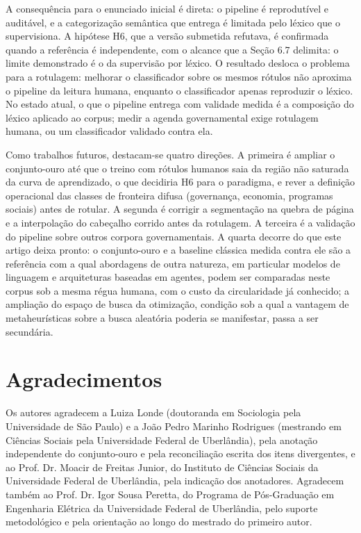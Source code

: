 \documentclass[fleqn,10pt]{SelfArx}
\begin{document}
A consequência para o enunciado inicial é direta: o pipeline é reprodutível e auditável, e a categorização semântica que entrega é limitada pelo léxico que o supervisiona. A hipótese H6, que a versão submetida refutava, é confirmada quando a referência é independente, com o alcance que a Seção 6.7 delimita: o limite demonstrado é o da supervisão por léxico. O resultado desloca o problema para a rotulagem: melhorar o classificador sobre os mesmos rótulos não aproxima o pipeline da leitura humana, enquanto o classificador apenas reproduzir o léxico. No estado atual, o que o pipeline entrega com validade medida é a composição do léxico aplicado ao corpus; medir a agenda governamental exige rotulagem humana, ou um classificador validado contra ela.

Como trabalhos futuros, destacam-se quatro direções. A primeira é ampliar o conjunto-ouro até que o treino com rótulos humanos saia da região não saturada da curva de aprendizado, o que decidiria H6 para o paradigma, e rever a definição operacional das classes de fronteira difusa (governança, economia, programas sociais) antes de rotular. A segunda é corrigir a segmentação na quebra de página e a interpolação do cabeçalho corrido antes da rotulagem. A terceira é a validação do pipeline sobre outros corpora governamentais. A quarta decorre do que este artigo deixa pronto: o conjunto-ouro e a baseline clássica medida contra ele são a referência com a qual abordagens de outra natureza, em particular modelos de linguagem e arquiteturas baseadas em agentes, podem ser comparadas neste corpus sob a mesma régua humana, com o custo da circularidade já conhecido; a ampliação do espaço de busca da otimização, condição sob a qual a vantagem de metaheurísticas sobre a busca aleatória poderia se manifestar, passa a ser secundária.

\section*{Agradecimentos}
Os autores agradecem a Luiza Londe (doutoranda em Sociologia pela Universidade de São Paulo) e a João Pedro Marinho Rodrigues (mestrando em Ciências Sociais pela Universidade Federal de Uberlândia), pela anotação independente do conjunto-ouro e pela reconciliação escrita dos itens divergentes, e ao Prof. Dr. Moacir de Freitas Junior, do Instituto de Ciências Sociais da Universidade Federal de Uberlândia, pela indicação dos anotadores. Agradecem também ao Prof. Dr. Igor Sousa Peretta, do Programa de Pós-Graduação em Engenharia Elétrica da Universidade Federal de Uberlândia, pelo suporte metodológico e pela orientação ao longo do mestrado do primeiro autor.
\end{document}

